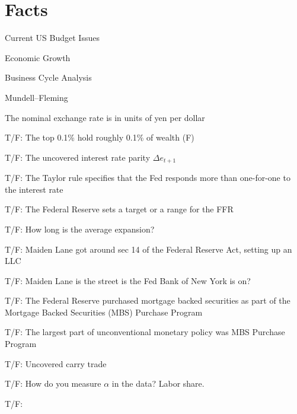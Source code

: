 \documentclass[presentation,dvipsnames]{beamer}
\begin{document}
\section{Facts}
\label{sec-7}
\begin{frame}[label=sec-7-1]{Current US Budget Issues}
\end{frame}
\begin{frame}[label=sec-7-2]{Economic Growth}
\end{frame}
\begin{frame}[label=sec-7-3]{Business Cycle Analysis}
\end{frame}
\begin{frame}[label=sec-7-4]{Mundell--Fleming}
\begin{block}{The nominal exchange rate is in units of yen per dollar}
\end{block}
\begin{block}{T/F: The top 0.1\% hold roughly 0.1\% of wealth (F)}
\end{block}
\begin{block}{T/F: The uncovered interest rate parity $\Delta e_{t+1}$}
\end{block}
\begin{block}{T/F: The Taylor rule specifies that the Fed responds more than one-for-one to the interest rate}
\end{block}
\begin{block}{T/F: The Federal Reserve sets a target or a range for the FFR}
\end{block}
\begin{block}{T/F: How long is the average expansion?}
\end{block}
\begin{block}{T/F: Maiden Lane got around sec 14 of the Federal Reserve Act, setting up an LLC}
\end{block}
\begin{block}{T/F: Maiden Lane is the street is the Fed Bank of New York is on?}
\end{block}
\begin{block}{T/F: The Federal Reserve purchased mortgage backed securities as part of the Mortgage Backed Securities (MBS) Purchase Program}
\end{block}
\begin{block}{T/F: The largest part of unconventional monetary policy was MBS Purchase Program}
\end{block}
\begin{block}{T/F: Uncovered carry trade}
\end{block}
\begin{block}{T/F: How do you measure $\alpha$ in the data? Labor share.}
\end{block}
\begin{block}{T/F:}
\end{block}
\end{frame}
\end{document}
